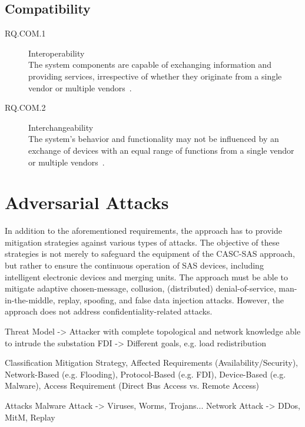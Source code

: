 \subsection{Compatibility}
\begin{description}
    \item[RQ.COM.1] Interoperability\\
    The system components are capable of exchanging information and providing services, irrespective of whether they originate from a single vendor or multiple vendors~\cite{IEC61850P5}.
    \item[RQ.COM.2] Interchangeability\\
    The system's behavior and functionality may not be influenced by an exchange of devices with an equal range of functions from a single vendor or multiple vendors~\cite{IEC61850P5}.
\end{description}

\section{Adversarial Attacks}
\label{sec:approach:attacks}
In addition to the aforementioned requirements, the approach has to provide mitigation strategies against various types of attacks.
The objective of these strategies is not merely to safeguard the equipment of the CASC-SAS approach, but rather to ensure the continuous operation of SAS devices, including intelligent electronic devices and merging units.
The approach must be able to mitigate adaptive chosen-message, collusion, (distributed) denial-of-service, man-in-the-middle, replay, spoofing, and false data injection attacks.
However, the approach does not address confidentiality-related attacks.

Threat Model -> Attacker with complete topological and network knowledge able to intrude the substation
FDI -> Different goals, e.g. load redistribution

Classification
Mitigation Strategy, Affected Requirements (Availability/Security), Network-Based (e.g. Flooding), Protocol-Based (e.g. FDI), Device-Based (e.g. Malware), Access Requirement (Direct Bus Access vs. Remote Access)

Attacks
Malware Attack -> Viruses, Worms, Trojans...
Network Attack -> DDos, MitM, Replay

